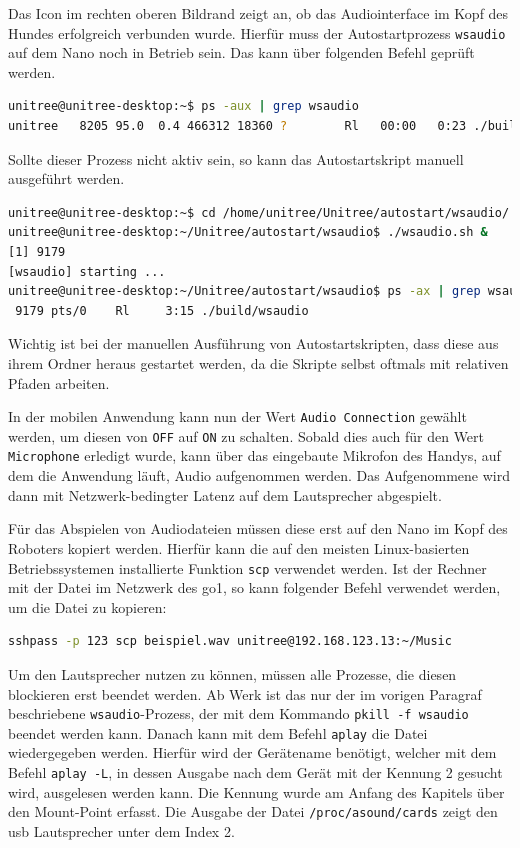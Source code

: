 Das Icon im rechten oberen Bildrand zeigt an, ob das Audiointerface im Kopf des Hundes erfolgreich verbunden wurde.
Hierfür muss der Autostartprozess \texttt{wsaudio} auf dem Nano noch in Betrieb sein.
Das kann über folgenden Befehl geprüft werden.

\begin{lstlisting}[language=Bash]
unitree@unitree-desktop:~$ ps -aux | grep wsaudio
unitree   8205 95.0  0.4 466312 18360 ?        Rl   00:00   0:23 ./build/wsaudio
\end{lstlisting}

\noindent Sollte dieser Prozess nicht aktiv sein, so kann das Autostartskript manuell ausgeführt werden.

\begin{lstlisting}[language=Bash]
unitree@unitree-desktop:~$ cd /home/unitree/Unitree/autostart/wsaudio/
unitree@unitree-desktop:~/Unitree/autostart/wsaudio$ ./wsaudio.sh &
[1] 9179
[wsaudio] starting ...
unitree@unitree-desktop:~/Unitree/autostart/wsaudio$ ps -ax | grep wsaudio
 9179 pts/0    Rl     3:15 ./build/wsaudio
\end{lstlisting}

\noindent Wichtig ist bei der manuellen Ausführung von Autostartskripten, dass diese aus ihrem Ordner heraus gestartet werden,
da die Skripte selbst oftmals mit relativen Pfaden arbeiten.

In der mobilen Anwendung kann nun der Wert \texttt{Audio Connection} gewählt werden, um diesen von \texttt{OFF} auf
\texttt{ON} zu schalten.
Sobald dies auch für den Wert \texttt{Microphone} erledigt wurde, kann über das eingebaute Mikrofon des Handys, auf dem
die Anwendung läuft, Audio aufgenommen werden.
Das Aufgenommene wird dann mit Netzwerk-bedingter Latenz auf dem Lautsprecher abgespielt.


Für das Abspielen von Audiodateien müssen diese erst auf den Nano im Kopf des Roboters kopiert werden.
Hierfür kann die auf den meisten Linux-basierten Betriebssystemen installierte Funktion \texttt{scp} verwendet werden.
Ist der Rechner mit der Datei im Netzwerk des \gls{go1}, so kann folgender Befehl verwendet werden, um die Datei zu kopieren:

\begin{lstlisting}[language=Bash]
sshpass -p 123 scp beispiel.wav unitree@192.168.123.13:~/Music
\end{lstlisting}

Um den Lautsprecher nutzen zu können, müssen alle Prozesse, die diesen blockieren erst beendet werden.
Ab Werk ist das nur der im vorigen Paragraf beschriebene \texttt{wsaudio}-Prozess, der mit dem Kommando \texttt{pkill -f wsaudio}
beendet werden kann.
Danach kann mit dem Befehl \texttt{aplay} die Datei wiedergegeben werden.
Hierfür wird der Gerätename benötigt, welcher mit dem Befehl \texttt{aplay -L}, in dessen Ausgabe nach dem Gerät mit
der Kennung \num{2} gesucht wird, ausgelesen werden kann.
Die Kennung wurde am Anfang des Kapitels über den Mount-Point erfasst.
Die Ausgabe der Datei \texttt{/proc/\allowbreak asound/\allowbreak cards} zeigt den \gls{usb} Lautsprecher unter dem Index \num{2}.

